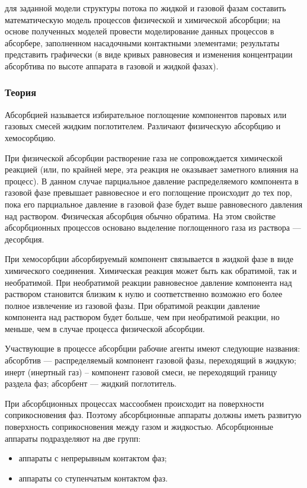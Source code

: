 
\goal для заданной модели структуры потока по жидкой и газовой фазам составить математическую модель процессов физической и химической абсорбции; на основе полученных моделей провести моделирование данных процессов в абсорбере, заполненном насадочными контактными элементами; результаты представить графически (в виде кривых равновесия и изменения концентрации абсорбтива по высоте аппарата в газовой и жидкой фазах).

\subsubsection{Теория}
Абсорбцией называется избирательное поглощение компонентов паровых или газовых смесей жидким поглотителем. Различают физическую абсорбцию и хемосорбцию.

При физической абсорбции растворение газа не сопровождается химической реакцией (или, по крайней мере, эта реакция не оказывает заметного влияния на процесс). В данном случае парциальное давление распределяемого компонента в газовой фазе превышает равновесное и его поглощение происходит до тех пор, пока его парциальное давление в газовой фазе будет выше равновесного давления над раствором. Физическая абсорбция обычно обратима. На этом свойстве абсорбционных процессов основано выделение поглощенного газа из раствора --- десорбция.

При хемосорбции абсорбируемый компонент связывается в жидкой фазе в виде химического соединения. Химическая реакция может быть как обратимой, так и необратимой. При необратимой реакции равновесное давление компонента над раствором становится близким к нулю и соответственно возможно его более полное извлечение из газовой фазы. При обратимой реакции давление компонента над раствором будет больше, чем при необратимой реакции, но меньше, чем в случае процесса физической абсорбции.

Участвующие в процессе абсорбции рабочие агенты имеют следующие названия:
абсорбтив --- распределяемый компонент газовой фазы, переходящий в жидкую;
инерт (инертный газ) -- компонент газовой смеси, не переходящий границу раздела фаз;
абсорбент --- жидкий поглотитель.

При абсорбционных процессах массообмен происходит на поверхности соприкосновения фаз. Поэтому абсорбционные аппараты должны иметь развитую поверхность соприкосновения между газом и жидкостью. Абсорбционные аппараты подразделяют на две групп:
\begin{itemize}
\item аппараты с непрерывным контактом фаз;
\item аппараты со ступенчатым контактом фаз.
\end{itemize}

